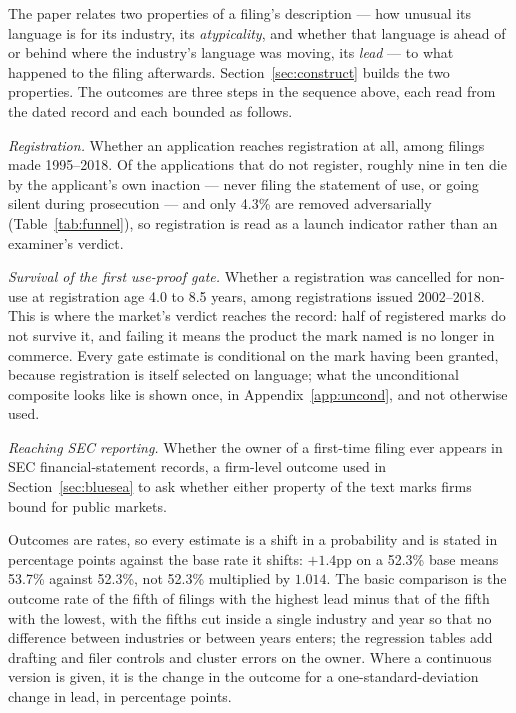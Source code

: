 The paper relates two properties of a filing's description --- how unusual
its language is for its industry, its \emph{atypicality}, and whether that
language is ahead of or behind where the industry's language was moving, its
\emph{lead} --- to what happened to the filing afterwards. Section~\ref{sec:construct}
builds the two properties. The outcomes are three steps in the sequence above,
each read from the dated record and each bounded as follows.

\emph{Registration.} Whether an application reaches registration at all,
among filings made 1995--2018. Of the applications that do not register,
roughly nine in ten die by the applicant's own inaction --- never filing the statement of use, or going
silent during prosecution --- and only 4.3\% are removed adversarially
(Table~\ref{tab:funnel}), so registration is read as a launch indicator rather
than an examiner's verdict.

\emph{Survival of the first use-proof gate.} Whether a registration was
cancelled for non-use at registration age 4.0 to 8.5 years, among
registrations issued 2002--2018. This is where the market's verdict reaches
the record: half of registered marks do not survive it, and failing it means
the product the mark named is no longer in commerce. Every gate estimate is
conditional on the mark having been granted, because registration is itself
selected on language; what the unconditional composite looks like is shown
once, in Appendix~\ref{app:uncond}, and not otherwise used.

\emph{Reaching SEC reporting.} Whether the owner of a first-time filing ever
appears in SEC financial-statement records, a firm-level outcome used in
Section~\ref{sec:bluesea} to ask whether either property of the text marks
firms bound for public markets.

Outcomes are rates, so every estimate is a shift in a probability and is
stated in percentage points against the base rate it shifts: $+1.4$pp on a
52.3\% base means 53.7\% against 52.3\%, not 52.3\% multiplied by $1.014$.
The basic comparison is the outcome rate of the fifth of filings with the
highest lead minus that of the fifth with the lowest, with the fifths cut
inside a single industry and year so that no difference between industries or
between years enters; the regression tables add drafting and filer controls
and cluster errors on the owner. Where a continuous version is given, it is
the change in the outcome for a one-standard-deviation change in lead, in
percentage points.

